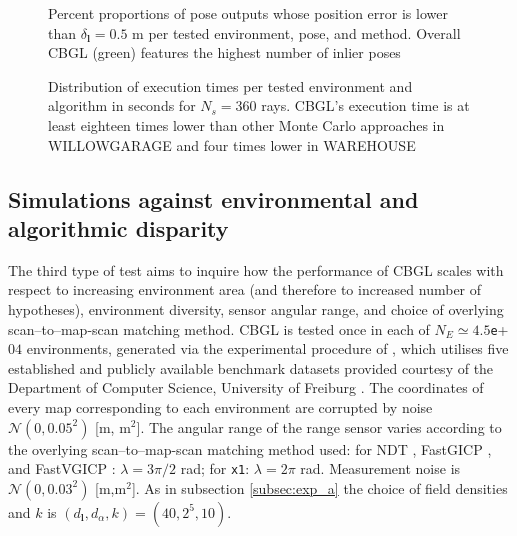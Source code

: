 \begin{figure}
  
  \caption{\small Percent proportions of pose outputs whose position error is
           lower than $\delta_{\bm{l}} = 0.5$ m per tested environment, pose,
           and method. Overall CBGL (green) features the highest number of
           inlier poses}
  \label{fig:b:inliers_per_pose}
\end{figure}

\begin{figure}
  
  \vspace{0.1cm}
  \caption{\small Distribution of execution times per tested environment and
           algorithm in seconds for $N_s = 360$ rays. CBGL's execution time is
           at least eighteen times lower than other Monte Carlo approaches in
           WILLOWGARAGE and four times lower in WAREHOUSE}
  \label{fig:b:execution_times}
\end{figure}


\subsection{Simulations against environmental and algorithmic disparity }
\label{subsec:exp_c}

The third type of test aims to inquire how the performance of CBGL scales with
respect to increasing environment area (and therefore to increased number of
hypotheses), environment diversity, sensor angular range, and choice of
overlying scan--to--map-scan matching method. CBGL is tested once in each of
$N_E \simeq 4.5$\texttt{e}+$04$ environments, generated via the experimental
procedure of \cite{Filotheou2023a}, which utilises five established and
publicly available benchmark datasets provided courtesy of the Department of
Computer Science, University of Freiburg \cite{datasets_link}.  The coordinates
of every map corresponding to each environment are corrupted by noise
$\mathcal{N}(0,0.05^2)$ [m, m$^2$]. The angular range of the range sensor
varies according to the overlying scan--to--map-scan matching method used: for
NDT \cite{ndt}, FastGICP \cite{fgi}, and FastVGICP \cite{fvg}: $\lambda =
3\pi/2$ rad; for \texttt{x1}: $\lambda = 2\pi$ rad. Measurement noise is
$\mathcal{N}(0,0.03^2)$ [m,m$^2$]. As in subsection \ref{subsec:exp_a} the
choice of field densities and $k$ is $(d_{\bm{l}},d_{\alpha},k) = (40, 2^5,
10)$.

